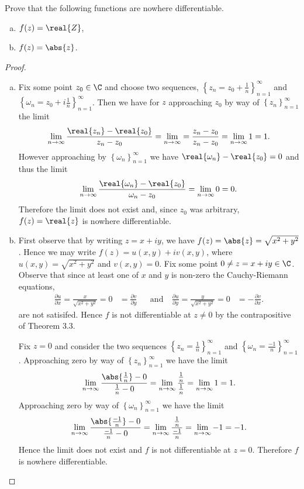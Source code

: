\documentclass[12pt]{amsart}
\begin{document}
\begin{thm}
  Prove that the following functions are nowhere differentiable.
  \begin{enumerate}[(a)]
    \item
      $f(z) = \real{Z}$,
    \item
      $f(z) = \abs{z}$.
  \end{enumerate}
  \begin{proof}
    \begin{enumerate}[(a)]
    \item
      Fix some point $z_0 \in \C$ and choose two sequences, $\left\{z_n = z_0 + \frac{1}{n}\right\}_{n=1}^\infty$ and $\left\{\omega_n = z_0 + i\frac{1}{n}\right\}_{n=1}^\infty$.
      Then we have for $z$ approaching $z_0$ by way of $\left\{z_n\right\}_{n=1}^\infty$ the limit
      $$\lim_{n \rightarrow \infty} \frac{\real{z_n} - \real{z_0}}{z_n - z_0} = \lim_{n\rightarrow \infty} = \frac{z_n - z_0}{z_n - z_0} = \lim_{n \rightarrow \infty} 1 = 1.$$
      However approaching by $\left\{\omega_n\right\}_{n=1}^\infty$ we have $\real{\omega_n} - \real{z_0} = 0$ and thus the limit
      $$\lim_{n \rightarrow \infty} \frac{\real{\omega_n} - \real{z_0}}{\omega_n - z_0} = \lim_{n\rightarrow \infty} 0 = 0.$$
      Therefore the limit does not exist and, since $z_0$ was arbitrary, $f(z) = \real{z}$ is nowhere differentiable.
    \item
      First observe that by writing $z = x + iy$, we have $f(z) = \abs{z} = \sqrt{x^2 + y^2}$.
      Hence we may write $f(z) = u(x,y) + iv(x,y)$, where $u(x,y) = \sqrt{x^2 + y^2}$ and $v(x,y) = 0$.
      Fix some point $0 \neq z = x + iy \in \C$.
      Observe that since at least one of $x$ and $y$ is non-zero the Cauchy-Riemann equations,
      \begin{align*}
        \frac{\partial u}{\partial x} = \frac{x}{\sqrt{x^2 + y^2}} = 0& = \frac{\partial v}{\partial y} &&\text{and}\ & \frac{\partial u}{\partial y} = \frac{y}{\sqrt{x^2 + y^2}} = 0 &= -\frac{\partial v}{\partial x}.
      \end{align*}
      are not satisifed.
      Hence $f$ is not differentiable at $z \neq 0$ by the contrapositive of Theorem 3.3.
      
      Fix $z = 0$ and consider the two sequences $\left\{z_n = \frac{1}{n} \right\}_{n=1}^\infty$ and $\left\{ \omega_n = \frac{-1}{n} \right\}_{n=1}^\infty$.
      Approaching zero by way of $\left\{z_n\right\}_{n=1}^\infty$ we have the limit
      $$\lim_{n \rightarrow \infty} \frac{\abs{\frac{1}{n}} - 0}{\frac{1}{n} - 0} = \lim_{n \rightarrow \infty} \frac{\frac{1}{n}}{\frac{1}{n}} = \lim_{n \rightarrow \infty} 1 = 1.$$
      Approaching zero by way of $\left\{\omega_n\right\}_{n=1}^\infty$ we have the limit
      $$\lim_{n \rightarrow \infty} \frac{\abs{\frac{-1}{n}} - 0}{\frac{-1}{n} - 0} = \lim_{n \rightarrow \infty} \frac{\frac{1}{n}}{\frac{-1}{n}} = \lim_{n \rightarrow \infty} -1 = -1.$$
      Hence the limit does not exist and $f$ is not differentiable at $z = 0$.
      Therefore $f$ is nowhere differentiable.
    \end{enumerate}
  \end{proof}
\end{thm}
\end{document}
